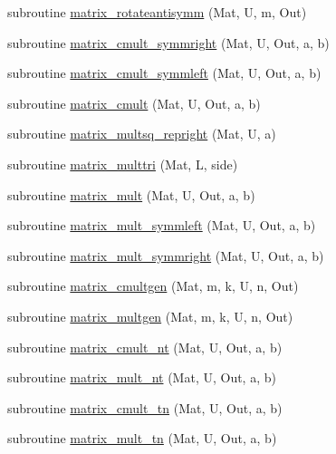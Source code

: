 \begin{DoxyCompactItemize}
\item 
subroutine \mbox{\hyperlink{namespacematrixutils_a6e5b7eb3ff08d14994be069ca192ea48}{matrix\+\_\+rotateantisymm}} (Mat, U, m, Out)
\item 
subroutine \mbox{\hyperlink{namespacematrixutils_a2098ca04f94da631caf2ebcce5ad7bf9}{matrix\+\_\+cmult\+\_\+symmright}} (Mat, U, Out, a, b)
\item 
subroutine \mbox{\hyperlink{namespacematrixutils_a4389445ac98a45384153fff75a6a21af}{matrix\+\_\+cmult\+\_\+symmleft}} (Mat, U, Out, a, b)
\item 
subroutine \mbox{\hyperlink{namespacematrixutils_a623ed13db8bf49d73e233e3668d3923c}{matrix\+\_\+cmult}} (Mat, U, Out, a, b)
\item 
subroutine \mbox{\hyperlink{namespacematrixutils_a061be118f549334b7196808f5ce55245}{matrix\+\_\+multsq\+\_\+repright}} (Mat, U, a)
\item 
subroutine \mbox{\hyperlink{namespacematrixutils_a5db9de44653dcfa367228c2b5a077b14}{matrix\+\_\+multtri}} (Mat, L, side)
\item 
subroutine \mbox{\hyperlink{namespacematrixutils_aa6a8ab9e79a8dd522f5375ebf4a50372}{matrix\+\_\+mult}} (Mat, U, Out, a, b)
\item 
subroutine \mbox{\hyperlink{namespacematrixutils_ab4f1087b56f3198b3d84c8ebf1cdd580}{matrix\+\_\+mult\+\_\+symmleft}} (Mat, U, Out, a, b)
\item 
subroutine \mbox{\hyperlink{namespacematrixutils_a97a6a772baa3485aaddba50623e50673}{matrix\+\_\+mult\+\_\+symmright}} (Mat, U, Out, a, b)
\item 
subroutine \mbox{\hyperlink{namespacematrixutils_af451dede0e0f43908b5f8fdbd6b64717}{matrix\+\_\+cmultgen}} (Mat, m, k, U, n, Out)
\item 
subroutine \mbox{\hyperlink{namespacematrixutils_a6efcf6a348628fcb3694cb23761b52ec}{matrix\+\_\+multgen}} (Mat, m, k, U, n, Out)
\item 
subroutine \mbox{\hyperlink{namespacematrixutils_afdb73dd3fe4ce57e9ba27e6d3d511376}{matrix\+\_\+cmult\+\_\+nt}} (Mat, U, Out, a, b)
\item 
subroutine \mbox{\hyperlink{namespacematrixutils_a4a084a8c031469076ac26bf4e9055109}{matrix\+\_\+mult\+\_\+nt}} (Mat, U, Out, a, b)
\item 
subroutine \mbox{\hyperlink{namespacematrixutils_a7c5f8b5e283bec1dcdcc4b82abbebd47}{matrix\+\_\+cmult\+\_\+tn}} (Mat, U, Out, a, b)
\item 
subroutine \mbox{\hyperlink{namespacematrixutils_a13557cd7745827af9e6873d3dbba3a1f}{matrix\+\_\+mult\+\_\+tn}} (Mat, U, Out, a, b)

\end{DoxyCompactItemize}
